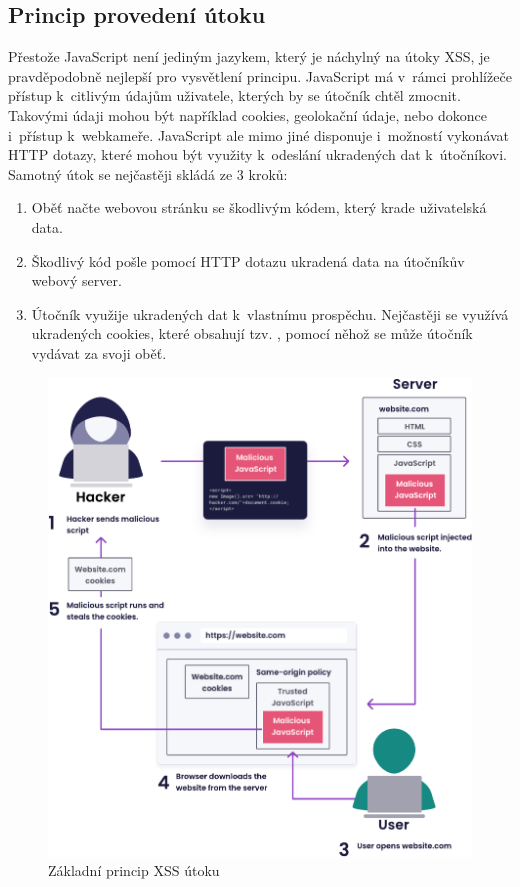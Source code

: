 \documentclass[11pt, conference, a4paper]{IEEEtran}
\begin{document}
\subsection{Princip provedení útoku}
Přestože JavaScript není jediným jazykem, který je náchylný na útoky XSS, je pravděpodobně nejlepší pro vysvětlení principu. JavaScript má v~rámci prohlížeče přístup k~citlivým údajům uživatele, kterých by se útočník chtěl zmocnit. Takovými údaji mohou být například cookies, geolokační údaje, nebo dokonce i~přístup k~webkameře. JavaScript ale mimo jiné disponuje i~možností vykonávat HTTP dotazy, které mohou být využity k~odeslání ukradených dat k~útočníkovi. Samotný útok se nejčastěji skládá ze 3 kroků:
\begin{enumerate}
    \item Oběť načte webovou stránku se škodlivým kódem, který krade uživatelská data.
    
    \item Škodlivý kód pošle pomocí HTTP dotazu ukradená data na útočníkův webový server.

    \item Útočník využije ukradených dat k~vlastnímu prospěchu. Nejčastěji se využívá ukradených cookies, které obsahují tzv. , pomocí něhož se může útočník vydávat za svoji oběť.~\cite{XSS-cloudflare}
    
\end{enumerate}

\begin{figure}
    \centering
    \caption{Základní princip XSS útoku \cite{snyk-xss}}
    \label{fig:xss}
    \includegraphics[width=1\linewidth]{XSS_Attack-cropped.pdf}
\end{figure}
\end{document}
